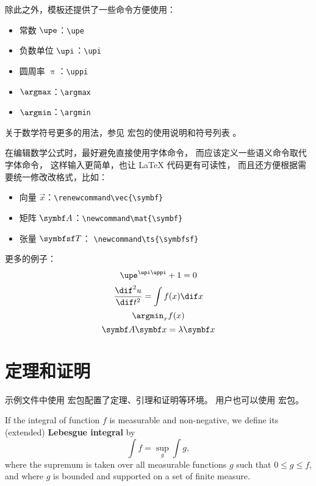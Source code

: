除此之外，模板还提供了一些命令方便使用：
\begin{itemize}
  \item 常数 $\upe$：\verb|\upe|
  \item 负数单位 $\upi$：\verb|\upi|
  \item 圆周率 $\uppi$：\verb|\uppi|
  \item $\argmax$：\verb|\argmax|
  \item $\argmin$：\verb|\argmin|
\end{itemize}

关于数学符号更多的用法，参见  宏包的使用说明和符号列表
。

在编辑数学公式时，最好避免直接使用字体命令，
而应该定义一些语义命令取代字体命令，
这样输入更简单，也让 \LaTeX{} 代码更有可读性，
而且还方便根据需要统一修改改格式，比如：
\begin{itemize}
  \item 向量 $\vec{x}$：\verb|\renewcommand\vec{\symbf}|
  \item 矩阵 $\mat{A}$：\verb|\newcommand\mat{\symbf}|
  \item 张量 $\ts{T}$： \verb|\newcommand\ts{\symbfsf}|
\end{itemize}

更多的例子：
\begin{equation}
  \upe^{\upi\uppi} + 1 = 0
\end{equation}
\begin{equation}
  \frac{\dif^2 u}{\dif t^2} = \int f(x) \dif x
\end{equation}
\begin{equation}
  \argmin_x f(x)
\end{equation}
\begin{equation}
  \mat{A} \vec{x} = \lambda \vec{x}
\end{equation}



\section{定理和证明}

示例文件中使用  宏包配置了定理、引理和证明等环境。
用户也可以使用   宏包。

\begin{definition}
  If the integral of function $f$ is measurable and non-negative, we define
  its (extended) \textbf{Lebesgue integral} by
  \begin{equation}
    \int f = \sup_g \int g,
  \end{equation}
  where the supremum is taken over all measurable functions $g$ such that
  $0 \le g \le f$, and where $g$ is bounded and supported on a set of
  finite measure.
\end{definition}

